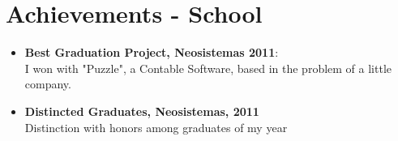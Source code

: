 \documentclass[a4paper,10pt]{article} %
\begin{document}

\section{Achievements - School}
\begin{itemize}
\item \textbf{Best Graduation Project, Neosistemas 2011}:\\
I won with "Puzzle", a Contable Software, based in the problem of a little company.
\item \textbf{Distincted Graduates, Neosistemas, 2011}\\
Distinction with honors among graduates of my year
\end{itemize}
\end{document}
